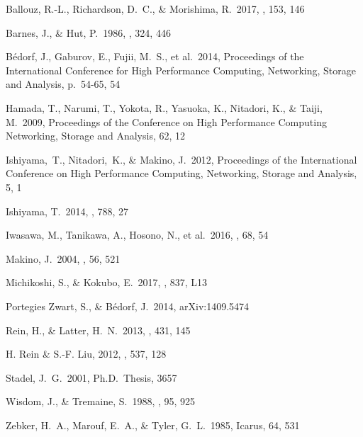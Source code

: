 \documentclass[]{pasj01}
\newcommand{\icarus}{Icarus}
\begin{document}
\begin{thebibliography}{}

 Ballouz, R.-L., Richardson, D.~C., \& Morishima, R.\ 2017, \aj, 153, 146  
  
 Barnes, J., \& Hut, P.\ 1986, \nat, 324, 446

 B{\'e}dorf, J., Gaburov, E., Fujii, M.~S., et al.\ 2014, Proceedings of the International Conference for High Performance Computing, Networking, Storage and Analysis, p.~54-65, 54
  
 Hamada, T., Narumi, T., Yokota, R., Yasuoka, K., Nitadori, K., \& Taiji, M.\ 2009, Proceedings of the Conference on High Performance
  Computing Networking, Storage and Analysis, 62, 12
  
  Ishiyama,~T., Nitadori,~K., \& Makino, J.\ 2012, Proceedings of the
  International Conference on High Performance Computing, Networking,
  Storage and Analysis, 5, 1
  
 Ishiyama, T.\ 2014, \apj, 788, 27

 Iwasawa, M., Tanikawa, A.,
  Hosono, N., et al.\ 2016, \pasj, 68, 54
  
 Makino, J.\ 2004, \pasj, 56, 521
    
 Michikoshi, S., \& Kokubo, E.\ 2017, \apjl, 837, L13

 Portegies Zwart, S., \& B{\'e}dorf, J.\ 2014, arXiv:1409.5474
  
 Rein, H., \& Latter, H.~N.\ 2013, \mnras, 431, 145

 H. {Rein} \& S.-F. {Liu}, 2012, \aap, 537, 128

 Stadel, J.~G.\ 2001, Ph.D.~Thesis, 3657
  
 Wisdom, J., \& Tremaine, S.\ 1988, \aj, 95, 925
  
 Zebker, H.~A., Marouf, E.~A., \& Tyler, G.~L.\ 1985, \icarus, 64, 531

\end{thebibliography}
  
\end{document}
